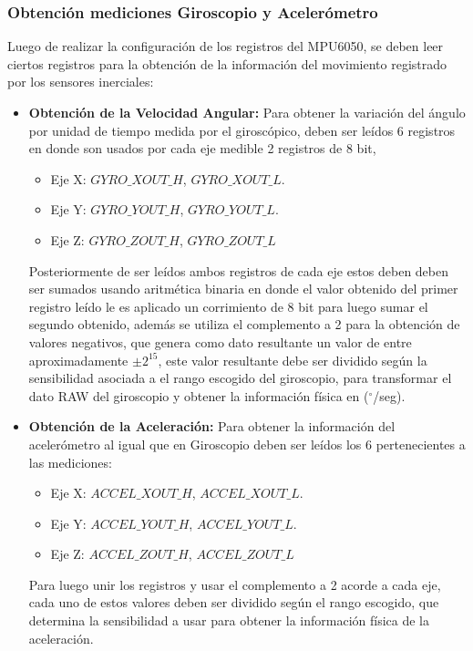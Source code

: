 \documentclass[12pt,a4paper]{article}
\newcommand{\grad}{$^{\circ}$}
\begin{document}
\subsubsection{Obtención mediciones Giroscopio y Acelerómetro}
Luego de realizar la configuración de los registros del MPU6050, se deben leer ciertos registros para la obtención de la información del movimiento registrado por los sensores inerciales:

\begin{itemize}
\item \textbf{Obtención de la Velocidad Angular:} Para obtener la variación del ángulo por unidad de tiempo medida por el giroscópico, deben ser leídos 6 registros en donde son usados por cada eje medible 2 registros de 8 bit,
\begin{itemize}
	\item Eje X: $GYRO\_XOUT\_H$, $GYRO\_XOUT\_L$.
	\item Eje Y: $GYRO\_YOUT\_H$, $GYRO\_YOUT\_L$.
	\item Eje Z: $GYRO\_ZOUT\_H$, $GYRO\_ZOUT\_L$
\end{itemize}
Posteriormente de ser leídos ambos registros de cada eje estos deben deben ser sumados usando aritmética binaria en donde el valor obtenido del primer registro leído le es aplicado un corrimiento de 8 bit para luego sumar el segundo obtenido, además se utiliza el complemento a 2 para la obtención de valores negativos, que genera como dato resultante un valor de entre aproximadamente $\pm 2^{15}$, este valor resultante debe ser dividido según la sensibilidad asociada a el rango escogido del giroscopio, para transformar el dato RAW del giroscopio y obtener la información física en (\grad/seg).

\item \textbf{Obtención de la Aceleración:} Para obtener la información del acelerómetro al igual que en Giroscopio deben ser leídos los 6 pertenecientes a las mediciones:
\begin{itemize}
	\item Eje X: $ACCEL\_XOUT\_H$, $ACCEL\_XOUT\_L$.
	\item Eje Y: $ACCEL\_YOUT\_H$, $ACCEL\_YOUT\_L$.
	\item Eje Z: $ACCEL\_ZOUT\_H$, $ACCEL\_ZOUT\_L$
\end{itemize}

Para luego unir los registros y usar el complemento a 2 acorde a cada eje, cada uno de estos valores deben ser dividido según el rango escogido, que determina la sensibilidad a usar para obtener la información física de la aceleración.


\end{itemize}
\end{document}
